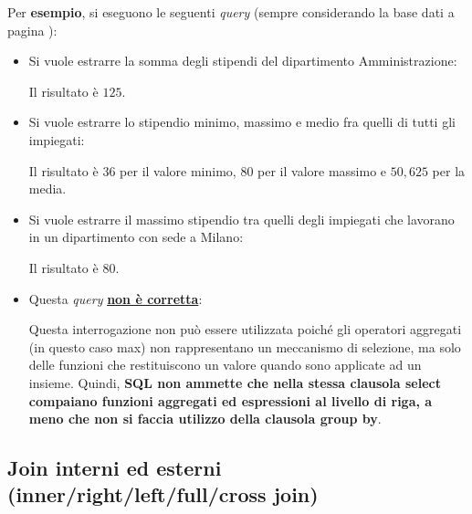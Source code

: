\documentclass[a4paper]{article}
\begin{document}
	\noindent
	Per \textcolor{Green4}{\textbf{esempio}}, si eseguono le seguenti \emph{query} (sempre considerando la base dati a pagina \pageref{select dbms}):
	\begin{itemize}
		\item Si vuole estrarre la somma degli stipendi del dipartimento Amministrazione:
		
		Il risultato è $125$.
		
		\item Si vuole estrarre lo stipendio minimo, massimo e medio fra quelli di tutti gli impiegati:
		
		Il risultato è $36$ per il valore minimo, $80$ per il valore massimo e $50,625$ per la media.
		
		\item Si vuole estrarre il massimo stipendio tra quelli degli impiegati che lavorano in un dipartimento con sede a Milano:
		
		Il risultato è $80$.
		
		\item Questa \emph{query} \underline{\textbf{non è corretta}}:
		
		Questa interrogazione non può essere utilizzata poiché gli operatori aggregati (in questo caso \textsf{max}) non rappresentano un meccanismo di selezione, ma solo delle funzioni che restituiscono un valore quando sono applicate ad un insieme. Quindi, \textbf{SQL non ammette che nella stessa clausola \textsf{select} compaiano funzioni aggregati ed espressioni al livello di riga, a meno che non si faccia utilizzo della clausola \textsf{group by}}.
	\end{itemize}\newpage

	\subsection{Join interni ed esterni (\textsf{inner/right/left/full/cross join})}
	
\end{document}
